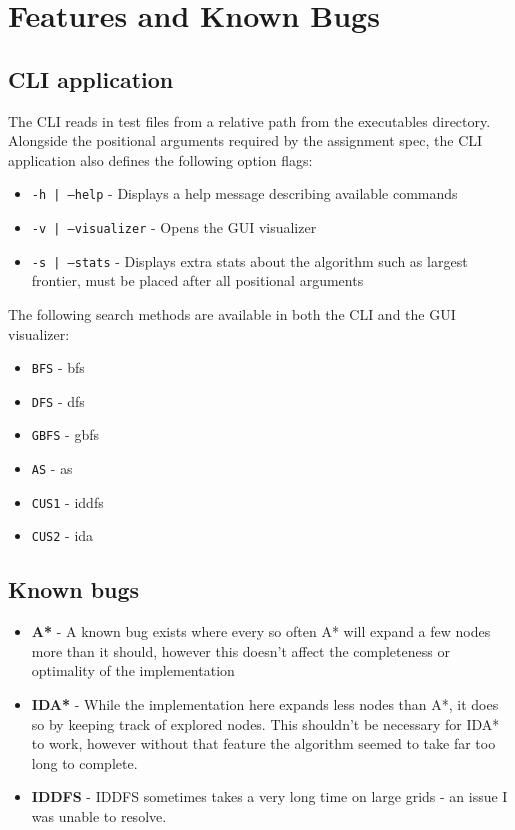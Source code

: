 \section{Features and Known Bugs} %
\label{sec:features}

\subsection{CLI application} %
\label{sub:cli_application}
The CLI reads in test files from a relative path from the executables directory. Alongside the positional arguments required by the assignment spec, the CLI application also defines the following option flags:
\begin{itemize}
	\item \texttt{-h | --help} - Displays a help message describing available commands
	\item \texttt{-v | --visualizer} - Opens the GUI visualizer
	\item \texttt{-s | --stats} - Displays extra stats about the algorithm such as largest frontier, must be placed after all positional arguments
\end{itemize}

The following search methods are available in both the CLI and the GUI visualizer:

\begin{itemize}
	\item \texttt{BFS} - \acrfull{bfs}
	\item \texttt{DFS} - \acrfull{dfs}
	\item \texttt{GBFS} - \acrfull{gbfs}
	\item \texttt{AS} - \acrfull{as}
	\item \texttt{CUS1} - \acrfull{iddfs}
	\item \texttt{CUS2} - \acrfull{ida}
\end{itemize}

\subsection{Known bugs} %
\label{sub:known_bugs}

\begin{itemize}
	\item \textbf{A*} - A known bug exists where every so often A* will expand a few nodes more than it should, however this doesn't affect the completeness or optimality of the implementation
	\item \textbf{IDA*} - While the implementation here expands less nodes than A*, it does so by keeping track of explored nodes. This shouldn't be necessary for IDA* to work, however without that feature the algorithm seemed to take far too long to complete.
	\item \textbf{IDDFS} - IDDFS sometimes takes a very long time on large grids - an issue I was unable to resolve.
\end{itemize}


